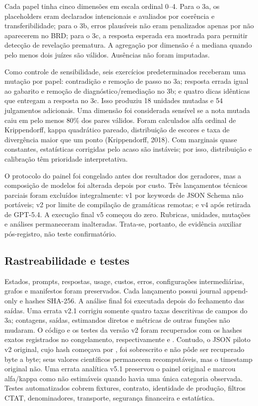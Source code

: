 \documentclass[11pt,a4paper]{article}
\begin{document}
Cada papel tinha cinco dimensões em escala ordinal 0--4. Para o 3a, os placeholders eram declarados intencionais e avaliados por coerência e transferibilidade; para o 3b, erros plausíveis não eram penalizados apenas por não aparecerem no BRD; para o 3c, a resposta esperada era mostrada para permitir detecção de revelação prematura. A agregação por dimensão é a mediana quando pelo menos dois juízes são válidos. Ausências não foram imputadas.

Como controle de sensibilidade, seis exercícios predeterminados receberam uma mutação por papel: contradição e remoção de passo no 3a; resposta errada igual ao gabarito e remoção de diagnóstico/remediação no 3b; e quatro dicas idênticas que entregam a resposta no 3c. Isso produziu 18 unidades mutadas e 54 julgamentos adicionais. Uma dimensão foi considerada sensível se a nota mutada caiu em pelo menos 80\% dos pares válidos. Foram calculados alfa ordinal de Krippendorff, kappa quadrático pareado, distribuição de escores e taxa de divergência maior que um ponto (Krippendorff, 2018). Com marginais quase constantes, estatísticas corrigidas pelo acaso são instáveis; por isso, distribuição e calibração têm prioridade interpretativa.

O protocolo do painel foi congelado antes dos resultados dos geradores, mas a composição de modelos foi alterada depois por custo. Três lançamentos técnicos parciais foram excluídos integralmente: v1 por keywords de JSON Schema não portáveis; v2 por limite de compilação de gramáticas remotas; e v4 após retirada de GPT-5.4. A execução final v5 começou do zero. Rubricas, unidades, mutações e análises permaneceram inalteradas. Trata-se, portanto, de evidência auxiliar pós-registro, não teste confirmatório.

\subsection{Rastreabilidade e testes}

Estados, prompts, respostas, usage, custos, erros, configurações intermediárias, grafos e manifestos foram preservados. Cada lançamento possui journal append-only e hashes SHA-256. A análise final foi executada depois do fechamento das saídas. Uma errata v2.1 corrigiu somente quatro taxas descritivas de campos do 3a; contagens, saídas, estimandos diretos e métricas de outras funções não mudaram. O código e os testes da versão v2 foram recuperados com os hashes exatos registrados no congelamento, respectivamente  e . Contudo, o JSON piloto v2 original, cujo hash começava por , foi sobrescrito e não pôde ser recuperado byte a byte; seus valores científicos permanecem recomputáveis, mas o timestamp original não. Uma errata analítica v5.1 preservou o painel original e marcou alfa/kappa como não estimáveis quando havia uma única categoria observada. Testes automatizados cobrem fixtures, contrato, identidade de produção, filtros CTAT, denominadores, transporte, segurança financeira e estatística.
\end{document}
